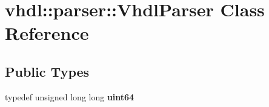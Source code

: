 \hypertarget{classvhdl_1_1parser_1_1_vhdl_parser}{}\section{vhdl\+::parser\+::Vhdl\+Parser Class Reference}
\label{classvhdl_1_1parser_1_1_vhdl_parser}
\subsection*{Public Types}
\begin{DoxyCompactItemize}
\item 
\mbox{\label{classvhdl_1_1parser_1_1_vhdl_parser_a95f5e79c79601054e289aadc9bafa413}} 
typedef unsigned long long {\bfseries uint64}
\end{DoxyCompactItemize}
